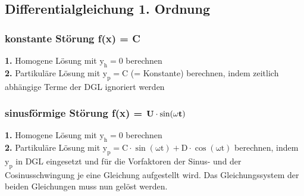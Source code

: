     \subsection{Differentialgleichung 1. Ordnung}
        \subsubsection{konstante Störung f(x) = C}
            \textbf{1.} Homogene Lösung mit $\mathrm{y_h = 0}$ berechnen\\
            \textbf{2.} Partikuläre Lösung mit $\mathrm{y_p = C}$ (= Konstante) berechnen, indem zeitlich abhängige Terme der DGL ignoriert werden
        \subsubsection{sinusförmige Störung f(x) = $\mathrm{\bf U \cdot \sin(\omega t)}$}
            \textbf{1.} Homogene Lösung mit $\mathrm{y_h = 0}$ berechnen\\
            \textbf{2.} Partikuläre Lösung mit $\mathrm{y_p = C \cdot \sin(\omega t) + D\cdot \cos(\omega t)}$ berechnen, indem $\mathrm{y_p}$ in DGL eingesetzt und für die Vorfaktoren der Sinus- und der Cosinusschwingung je eine Gleichung aufgestellt wird. Das Gleichungssystem der beiden Gleichungen muss nun gelöst werden.